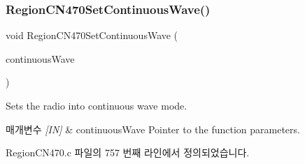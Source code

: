 \subsubsection{\texorpdfstring{Region\+C\+N470\+Set\+Continuous\+Wave()}{RegionCN470SetContinuousWave()}}
{\footnotesize\ttfamily void Region\+C\+N470\+Set\+Continuous\+Wave (\begin{DoxyParamCaption}\item[{\mbox{\hyperlink{group___r_e_g_i_o_n_gaf39bb5ba06921139c6d17f88a8d518cd}{Continuous\+Wave\+Params\+\_\+t}} $\ast$}]{continuous\+Wave }\end{DoxyParamCaption})}



Sets the radio into continuous wave mode. 


\begin{DoxyParams}{매개변수}
{\em \mbox{[}\+I\+N\mbox{]}} & continuous\+Wave Pointer to the function parameters. \\
\hline
\end{DoxyParams}


Region\+C\+N470.\+c 파일의 757 번째 라인에서 정의되었습니다.


